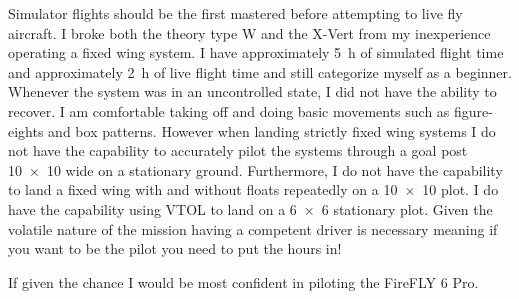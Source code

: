 Simulator flights should be the first mastered before attempting to live fly aircraft. I broke both the theory type W and the X-Vert from my inexperience operating a fixed wing system. I have approximately \SI{5}{\hour} of simulated flight time and approximately \SI{2}{\hour} of live flight time and still categorize myself as a beginner. Whenever the system was in an uncontrolled state, I did not have the ability to recover.  I am comfortable taking off and doing basic movements such as figure-eights and box patterns. However when landing strictly fixed wing systems I do not have the capability to accurately pilot the systems through a goal post \SI{10x10}{\foot} wide on a stationary ground. Furthermore, I do not have the capability to land a fixed wing with and without floats repeatedly on a \SI{10x10}{\foot} plot. I do have the capability using VTOL to land on a \SI{6x6}{\foot} stationary plot. Given the volatile nature of the mission having a competent driver is necessary meaning if you want to be the pilot you need to put the hours in! 

If given the chance I would be most confident in piloting the FireFLY 6 Pro. 
       
%
%
%
%
%
%
%
%
%
%
%  

